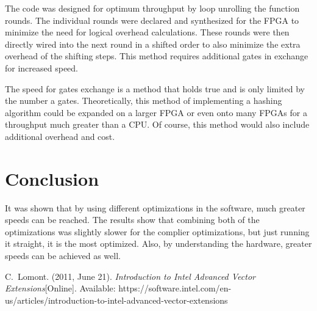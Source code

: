 \documentclass[journal]{IEEEtran}
\begin{document}
The code was designed for optimum throughput by loop unrolling the function rounds. The individual rounds were declared and synthesized for the FPGA to minimize the need for logical overhead calculations. These rounds were then directly wired into the next round in a shifted order to also minimize the extra overhead of the shifting steps. This method requires additional gates in exchange for increased speed.

The speed for gates exchange is a method that holds true and is only limited by the number a gates. Theoretically, this method of implementing a hashing algorithm could be expanded on a larger FPGA or even onto many FPGAs for a throughput much greater than a CPU. Of course, this method would also include additional overhead and cost. 

\section{Conclusion}
It was shown that by using different optimizations in the software, much greater speeds can be reached. The results show that combining both of the optimizations was slightly slower for the complier optimizations, but just running it straight, it is the most optimized. Also, by understanding the hardware, greater speeds can be achieved as well.

\ifCLASSOPTIONcaptionsoff
  \newpage
\fi

\begin{thebibliography}{1}

C.~Lomont. (2011, June 21). \emph{Introduction to Intel Advanced Vector Extensions}[Online]. Available: https://software.intel.com/en-us/articles/introduction-to-intel-advanced-vector-extensions 

\end{thebibliography}
\end{document}
